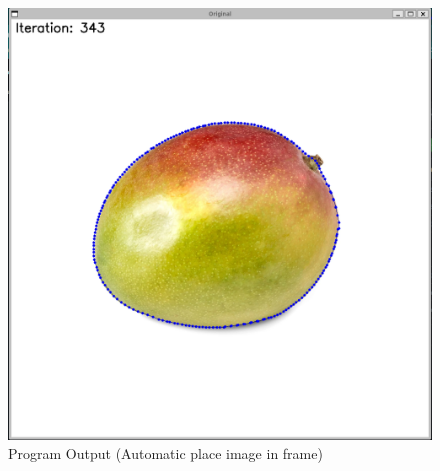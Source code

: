 \documentclass[12pt,a4paper]{report}
\begin{document}
\begin{figure}[!htb]
    \centering
    \includegraphics[width=1\linewidth]{program.png}
    \caption{Program Output (Automatic place image in frame)}
\end{figure}
\clearpage
\end{document}
